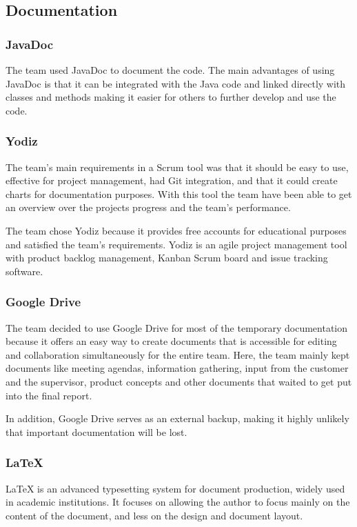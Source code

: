 \subsection{Documentation}

\subsubsection{JavaDoc}
The team used JavaDoc to document the code. The main advantages of using JavaDoc is that it can be integrated with the Java code and linked directly with classes and methods making it easier for others to further develop and use the code.\\

\subsubsection{Yodiz}
The team's main requirements in a Scrum tool was that it should be easy to use, effective for project management, had Git integration, and that it could create charts for documentation purposes. With this tool the team have been able to get an overview over the projects progress and the team's performance. 

The team chose Yodiz because it provides free accounts for educational purposes and satisfied the team's requirements. Yodiz is an agile project management tool with product backlog management, Kanban Scrum board and issue tracking software.\\

\subsubsection{Google Drive}
The team decided to use Google Drive for most of the temporary documentation because it offers an easy way to create documents that is accessible for editing and collaboration simultaneously for the entire team. Here, the team mainly kept documents like meeting agendas, information gathering, input from the customer and the supervisor, product concepts and other documents that waited to get put into the final report. 

In addition, Google Drive serves as an external backup, making it highly unlikely that important documentation will be lost. \\


\subsubsection{\LaTeX}
LaTeX is an advanced typesetting system for document production, widely used in
academic institutions. It focuses on allowing the author to focus mainly on the content of the document, and less on the design and document layout.

